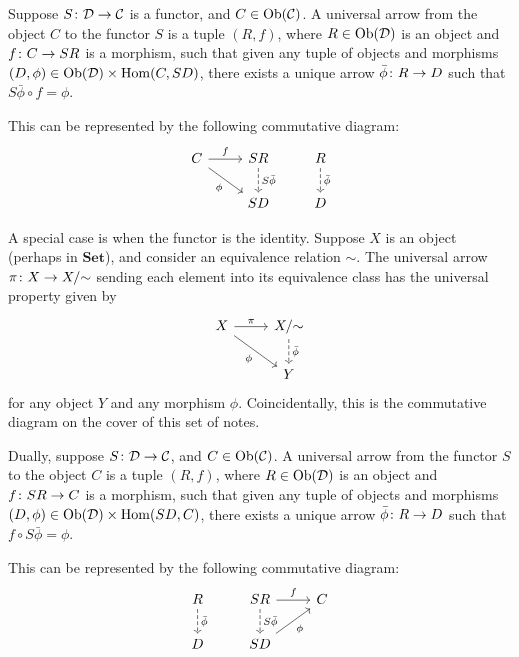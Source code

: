 \begin{definition}
    Suppose \(S\colon\mathcal{D}\to\mathcal{C}\) is a functor, and \(C \in \operatorname{Ob}(\mathcal{C})\).
    A universal arrow from the object \(C\) to the functor \(S\) is a tuple \((R,f)\),
    where \(R \in \operatorname{Ob}(\mathcal{D})\) is an object and \(f\colon C\to SR\) is a morphism,
    such that given any tuple of objects and morphisms \((D,\phi) \in \operatorname{Ob}(\mathcal{D})\times\operatorname{Hom}(C,SD)\),
    there exists a unique arrow \(\bar{\phi}\colon R\to D\) such that \(S\bar{\phi} \circ f = \phi\).

    This can be represented by the following commutative diagram:
    \begin{equation*}
        \begin{tikzcd}
            C \arrow{r}{f} \arrow{dr}[swap]{\phi} & SR \arrow[dashrightarrow]{d}{S\bar{\phi}} &
            R \arrow[dashrightarrow]{d}{\bar{\phi}} \\
            & SD & D
        \end{tikzcd}
    \end{equation*}
\end{definition}

\begin{definition}
    A special case is when the functor is the identity.
    Suppose \(X\) is an object (perhaps in \(\textbf{Set}\)),
    and consider an equivalence relation \(\sim\).
    The universal arrow \(\pi\colon X\to X/{\sim}\) sending each element into its equivalence class
    has the universal property given by
    \begin{equation*}
        \begin{tikzcd}
            X \arrow{r}{\pi} \arrow{rd}[swap]{\phi} &
            X/{\sim} \arrow[dashrightarrow]{d}{\bar{\phi}} \\
            & Y
        \end{tikzcd}
    \end{equation*}
    for any object \(Y\) and any morphism \(\phi\).
    Coincidentally, this is the commutative diagram on the cover of this set of notes.
\end{definition}

\begin{definition}
    Dually, suppose \(S\colon\mathcal{D}\to\mathcal{C}\), and \(C \in \operatorname{Ob}(\mathcal{C})\).
    A universal arrow from the functor \(S\) to the object \(C\) is a tuple \((R,f)\),
    where \(R \in \operatorname{Ob}(\mathcal{D})\) is an object and \(f\colon SR\to C\) is a morphism,
    such that given any tuple of objects and morphisms \((D,\phi) \in \operatorname{Ob}(\mathcal{D})\times\operatorname{Hom}(SD,C)\),
    there exists a unique arrow \(\bar{\phi}\colon R\to D\) such that \(f \circ S\bar{\phi} = \phi\).

    This can be represented by the following commutative diagram:
    \begin{equation*}
        \begin{tikzcd}
            R \arrow[dashrightarrow]{d}{\bar{\phi}} &
            SR \arrow{r}{f} \arrow[dashrightarrow]{d}{S\bar{\phi}} & C \\
            D & SD \arrow{ru}[swap]{\phi}
        \end{tikzcd}
    \end{equation*}
\end{definition}

